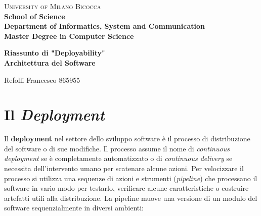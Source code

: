 \documentclass[a4paper,11pt,oneside, table]{article}
\begin{document}
  \noindent
  \begin{minipage}[t]{0.19\textwidth}
  \end{minipage}
  \begin{minipage}[t]{0.81\textwidth}
    {
      {\textsc{University of Milano Bicocca}} \\
      \textbf{School of Science} \\
      \textbf{Department of Informatics, System and Communication} \\
      \textbf{Master Degree in Computer Science} \\
      \par
    }
  \end{minipage}
  \begin{center}
    {\LARGE{
      \textbf{Riassunto di "Deployability"} \\
      \textbf{Architettura del Software}
      \par
    }}
  \end{center}
  \begin{center}
    \large{Refolli Francesco} \large{865955}
  \end{center}

  \renewcommand{\baselinestretch}{1.5}

  \section{Il \textit{Deployment}}

  Il \textbf{deployment} nel settore dello sviluppo software \`e il processo di distribuzione del software o di sue modifiche. Il processo assume il nome di \textit{continuous deployment} se \`e completamente automatizzato o di \textit{continuous delivery} se necessita dell'intervento umano per scatenare alcune azioni. Per velocizzare il processo si utilizza una sequenze di azioni e strumenti (\textit{pipeline}) che processano il software in vario modo per testarlo, verificare alcune caratteristiche o costruire artefatti utili alla distribuzione. La pipeline muove una versione di un modulo del software sequenzialmente in diversi ambienti:
\end{document}
